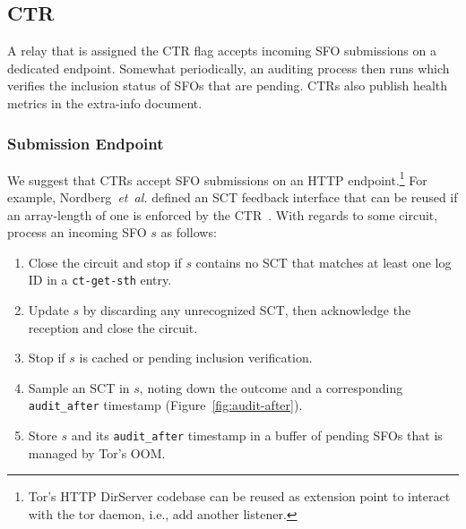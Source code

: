 %
%

\subsection{CTR}
A relay that is assigned the CTR flag accepts incoming SFO submissions on a
dedicated endpoint.  Somewhat periodically, an auditing process then runs which
verifies the inclusion status of SFOs that are pending.  CTRs also
publish health metrics in the extra-info document.

\subsubsection{Submission Endpoint} \label{sec:design:api}
We suggest that CTRs accept SFO submissions on an HTTP endpoint.\footnote{%
	Tor's HTTP DirServer codebase can be reused as extension point to interact
	with the tor daemon, i.e., add another listener.
} For example, Nordberg~\emph{et~al.} defined an SCT feedback interface that can
be reused if an array-length of one is enforced by the CTR~\cite{nordberg}.
With regards to some circuit, process an incoming SFO $s$ as follows:
\begin{enumerate}
	\item\label{enm:ctr-api:well-formed} Close the circuit and stop if $s$
		contains no SCT that matches at least one log ID in a
	\texttt{ct-get-sth} entry.
	\item\label{enm:ctr-api:ack} Update $s$ by discarding any
		unrecognized SCT, %
		then acknowledge the reception and close the circuit.
	\item\label{enm:ctr-api:cached}
		Stop if $s$ is cached or pending inclusion verification.
	\item\label{enm:ctr-api:audit-after} Sample an SCT in $s$, noting down the
		outcome and a corresponding \texttt{audit\_after} timestamp
		(Figure~\ref{fig:audit-after}).
	\item\label{enm:ctr-api:store} Store $s$ and its \texttt{audit\_after}
		timestamp in a buffer of pending SFOs that is managed by Tor's OOM.
\end{enumerate}

